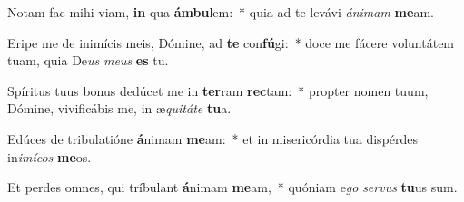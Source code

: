 \item Notam fac mihi viam, \textbf{in} qua \textbf{ám}\textbf{bu}lem:~* quia ad te levávi \textit{á}\textit{ni}\textit{mam} \textbf{me}am.
\item Eripe me de inimícis meis, Dómine, ad \textbf{te} con\textbf{fú}gi:~* doce me fácere voluntátem tuam, quia De\textit{us} \textit{me}\textit{us} \textbf{es} tu.
\item Spíritus tuus bonus dedúcet me in \textbf{ter}ram \textbf{rec}tam:~* propter nomen tuum, Dómine, vivificábis me, in æ\textit{qui}\textit{tá}\textit{te} \textbf{tu}a.
\item Edúces de tribulatióne \textbf{á}nimam \textbf{me}am:~* et in misericórdia tua dispérdes in\textit{i}\textit{mí}\textit{cos} \textbf{me}os.
\item Et perdes omnes, qui tríbulant \textbf{á}nimam \textbf{me}am,~* quóniam e\textit{go} \textit{ser}\textit{vus} \textbf{tu}us sum.
